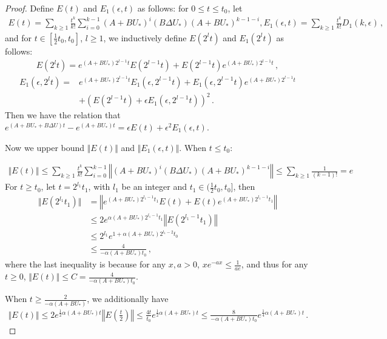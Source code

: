 \documentclass{article}
\theoremstyle{definition}
\begin{document}
\begin{proof}
Define $E(t)$ and $E_{1}(\epsilon,t)$ as follows: for $0\leq t\leq t_{0}$, let
\begin{align*}
E(t)=\sum_{k\geq 1}\frac{t^{k}}{k!}\sum_{i=0}^{k-1}(A+BU_{*})^{i}(B\Delta U_{*})(A+BU_{*})^{k-1-i}, E_{1}(\epsilon,t)=\sum_{k\geq 1}\frac{t^{k}}{k!}D_{1}(k,\epsilon)\,,
\end{align*}
and for $t\in[\frac{1}{2}t_{0},t_{0}]$, $l\geq1$, we inductively define $E(2^{l}t)$ and $E_{1}(2^{l}t)$ as follows:
\begin{align*}
E(2^{l}t)=e^{(A+BU_{*})2^{l-1}t}E(2^{l-1}t)+E(2^{l-1}t)e^{(A+BU_{*})2^{l-1}t}\,,
\end{align*}
\begin{align*}
E_{1}(\epsilon,2^{l}t)=&e^{(A+BU_{*})2^{l-1}t}E_{1}(\epsilon, 2^{l-1}t)+E_{1}(\epsilon, 2^{l-1}t)e^{(A+BU_{*})2^{l-1}t}\\
&+\left(E(2^{l-1}t)+\epsilon E_{1}(\epsilon,2^{l-1}t)\right)^{2}\,.
\end{align*}
Then we have the relation that $e^{(A+BU_{*}+B\Delta U)t}-e^{(A+BU_{*})t}=\epsilon E(t)+\epsilon^{2}E_{1}(\epsilon,t)$.

Now we upper bound $\Vert E(t)\Vert $ and $\Vert E_{1}(\epsilon,t)\Vert $. When $t\leq t_{0}$:

\begin{align*}
\Vert E(t)\Vert \leq\sum_{k\geq 1}\frac{t^{k}}{k!}\sum_{i=0}^{k-1}\left\Vert (A+BU_{*})^{i}(B\Delta U_{*})(A+BU_{*})^{k-1-i}\right\Vert \leq \sum_{k\geq 1}\frac{1}{(k-1)!}=e
\end{align*}
For $t\geq t_{0}$, let $t=2^{l_{1}}t_{1}$, with $l_{1}$ be an integer and $t_{1}\in(\frac{1}{2}t_{0},t_{0}]$, then
\begin{align*}
\Vert E(2^{l_{1}}t_{1})\Vert &=\left\Vert e^{(A+BU_{*})2^{l_1-1}t_{1}}E(t)+E(t)e^{(A+BU_{*})2^{l_1-1}t_{1}}\right\Vert \\
&\leq 2e^{\alpha(A+BU_{*})2^{l_1-1}t_{1}}\left\Vert E(2^{l_1-1}t_{1})\right\Vert \\
&\leq 2^{l_1}e^{1+\alpha(A+BU_{*})2^{l_1-2}t_{0}}\\
&\leq \frac{4}{-\alpha(A+BU_{*})t_{0}}\,,
\end{align*}
where the last inequality is because for any $x,a>0$, $xe^{-ax}\leq \frac{1}{ae}$, and thus for any $t\geq 0$, $\Vert E(t)\Vert \leq C=\frac{4}{-\alpha(A+BU_{*})t_{0}}$.

When $t\geq \frac{2}{-\alpha(A+BU_{*})}$, we additionally have
\begin{align*}
\Vert E(t)\Vert \leq 2e^{\frac{1}{2}\alpha(A+BU_{*})t}\left\Vert E(\frac{t}{2})\right\Vert\leq \frac{4t}{t_{0}}e^{\frac{1}{2}\alpha(A+BU_{*})t}\leq\frac{8}{-\alpha(A+BU_{*})t_{0}}e^{\frac{1}{4}\alpha(A+BU_{*})t}\,.
\end{align*}



\end{proof}
\end{document}
